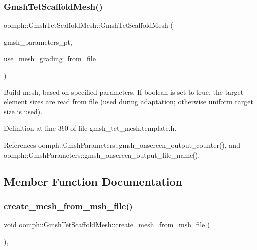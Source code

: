 \subsubsection{\texorpdfstring{Gmsh\+Tet\+Scaffold\+Mesh()}{GmshTetScaffoldMesh()}}
{\footnotesize\ttfamily oomph\+::\+Gmsh\+Tet\+Scaffold\+Mesh\+::\+Gmsh\+Tet\+Scaffold\+Mesh (\begin{DoxyParamCaption}\item[{\hyperlink{classoomph_1_1GmshParameters}{Gmsh\+Parameters} $\ast$}]{gmsh\+\_\+parameters\+\_\+pt,  }\item[{const bool \&}]{use\+\_\+mesh\+\_\+grading\+\_\+from\+\_\+file }\end{DoxyParamCaption})\hspace{0.3cm}{\ttfamily [inline]}}



Build mesh, based on specified parameters. If boolean is set to true, the target element sizes are read from file (used during adaptation; otherwise uniform target size is used). 



Definition at line 390 of file gmsh\+\_\+tet\+\_\+mesh.\+template.\+h.



References oomph\+::\+Gmsh\+Parameters\+::gmsh\+\_\+onscreen\+\_\+output\+\_\+counter(), and oomph\+::\+Gmsh\+Parameters\+::gmsh\+\_\+onscreen\+\_\+output\+\_\+file\+\_\+name().



\subsection{Member Function Documentation}
\mbox{\label{classoomph_1_1GmshTetScaffoldMesh_a13c5fa9a126fc1707534031826d8f43f}} 
\subsubsection{\texorpdfstring{create\+\_\+mesh\+\_\+from\+\_\+msh\+\_\+file()}{create\_mesh\_from\_msh\_file()}}
{\footnotesize\ttfamily void oomph\+::\+Gmsh\+Tet\+Scaffold\+Mesh\+::create\+\_\+mesh\+\_\+from\+\_\+msh\+\_\+file (\begin{DoxyParamCaption}{ }\end{DoxyParamCaption})\hspace{0.3cm}{\ttfamily [inline]}, {\ttfamily [private]}}



